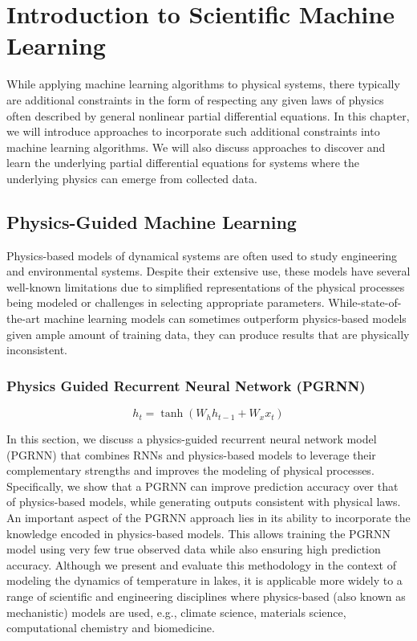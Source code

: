 \documentclass[book.tex]{subfiles}
\begin{document}
\chapter{Introduction to Scientific Machine Learning}
\label{ch:intro-molecular-ml}
While applying machine learning algorithms to physical systems, there typically are additional constraints in the form of respecting any given laws of physics often described by general nonlinear partial differential equations. In this chapter, we will introduce approaches to incorporate such additional constraints into machine learning algorithms. We will also discuss approaches to discover and learn the underlying partial differential equations for systems where the underlying physics can emerge from collected data. 


\section{Physics-Guided Machine Learning}

Physics-based models of dynamical systems are often used to study engineering and environmental systems. Despite their extensive use, these models have several well-known limitations due to simplified representations of the physical processes being modeled or challenges in selecting appropriate parameters. While-state-of-the-art machine learning models can sometimes outperform physics-based models given ample amount of training data, they can produce results that are physically inconsistent. 

\subsection{Physics Guided Recurrent Neural Network (PGRNN)}

\begin{equation}
    h_t= \tanh(W_hh_{t-1}+W_x x_t)
\end{equation}

In this section, we discuss a physics-guided recurrent neural network model (PGRNN) that combines RNNs and physics-based models to leverage their complementary strengths and improves the modeling of physical processes. Specifically, we show that a PGRNN can improve prediction accuracy over that of physics-based models, while generating outputs consistent with physical laws. An important aspect of the PGRNN approach lies in its ability to incorporate the knowledge encoded in physics-based models. This allows training the PGRNN model using very few true observed data while also ensuring high prediction accuracy. Although we present and evaluate this methodology in the context of modeling the dynamics of temperature in lakes, it is applicable more widely to a range of scientific and engineering disciplines where physics-based (also known as mechanistic) models are used, e.g., climate science, materials science, computational chemistry and biomedicine.
\end{document}
